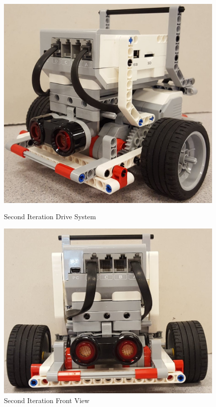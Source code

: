 \documentclass[11pt]{article}
\begin{document}
\begin{figure}[htp]
\centering
\captionsetup{justification=centering}
\includegraphics[scale=0.13]{images/Hardware_Mechanical/Third_Iteration_3D.jpg}
\caption{Second Iteration Drive System}\label{fig:Drive System}
\endminipage\hfill
{}
\includegraphics[scale=0.17]{images/Hardware_Mechanical/Third_Iteration_Front.jpg}
\caption{Second Iteration Front View}\label{fig:Front View}

\end{figure}
\end{document}
